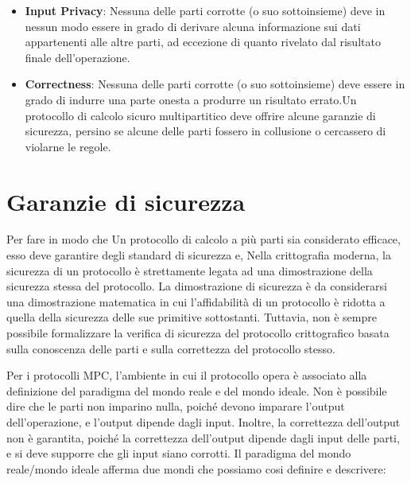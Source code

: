 \documentclass[
]{book}
\providecommand{\tightlist}{%
  \setlength{\itemsep}{0pt}\setlength{\parskip}{0pt}}
\begin{document}
\begin{itemize}
\tightlist
\item
  \textbf{Input Privacy}: Nessuna delle parti corrotte (o suo sottoinsieme) deve in nessun modo essere in grado di derivare alcuna informazione sui dati appartenenti alle altre parti, ad eccezione di quanto rivelato dal risultato finale dell'operazione.
\item
  \textbf{Correctness}: Nessuna delle parti corrotte (o suo sottoinsieme) deve essere in grado di indurre una parte onesta a produrre un risultato errato.Un protocollo di calcolo sicuro multipartitico deve offrire alcune garanzie di sicurezza, persino se alcune delle parti fossero in collusione o cercassero di violarne le regole.
\end{itemize}

\hypertarget{garanzie-di-sicurezza}{%
\section{Garanzie di sicurezza}\label{garanzie-di-sicurezza}}

Per fare in modo che Un protocollo di calcolo a più parti sia considerato efficace, esso deve garantire degli standard di sicurezza e, Nella crittografia moderna, la sicurezza di un protocollo è strettamente legata ad una dimostrazione della sicurezza stessa del protocollo. La dimostrazione di sicurezza è da considerarsi una dimostrazione matematica in cui l'affidabilità di un protocollo è ridotta a quella della sicurezza delle sue primitive sottostanti. Tuttavia, non è sempre possibile formalizzare la verifica di sicurezza del protocollo crittografico basata sulla conoscenza delle parti e sulla correttezza del protocollo stesso.

\newpage

Per i protocolli MPC, l'ambiente in cui il protocollo opera è associato alla definizione del paradigma del mondo reale e del mondo ideale. Non è possibile dire che le parti non imparino nulla, poiché devono imparare l'output dell'operazione, e l'output dipende dagli input. Inoltre, la correttezza dell'output non è garantita, poiché la correttezza dell'output dipende dagli input delle parti, e si deve supporre che gli input siano corrotti.
Il paradigma del mondo reale/mondo ideale afferma due mondi che possiamo cosi definire e descrivere:
\end{document}
